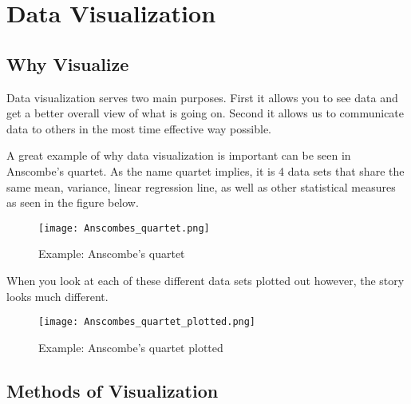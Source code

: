 \section{Data Visualization}
\subsection{Why Visualize}

\begin{flushleft}
Data visualization serves two main purposes. First it allows you to see data and get a better overall view of what is going on. Second it allows us to communicate data to others in the most time effective way possible. 
\end{flushleft}

\begin{flushleft}
A great example of why data visualization is important can be seen in Anscombe’s quartet. As the name quartet implies, it is 4 data sets that share the same mean, variance, linear regression line, as well as other statistical measures as seen in the figure below.
\end{flushleft}

\begin{figure}[H]
    \centering
    \texttt{[image: Anscombes\_quartet.png]}
    \caption{Example: Anscombe's quartet}
    \label{fig:Anscombes}
\end{figure}

\begin{flushleft}
When you look at each of these different data sets plotted out however, the story looks much different.
\end{flushleft}

\begin{figure}[H]
    \centering
    \texttt{[image: Anscombes\_quartet\_plotted.png]}
    \caption{Example: Anscombe's quartet plotted}
    \label{fig:Anscombes_plotted}
\end{figure}

\subsection{Methods of Visualization}

